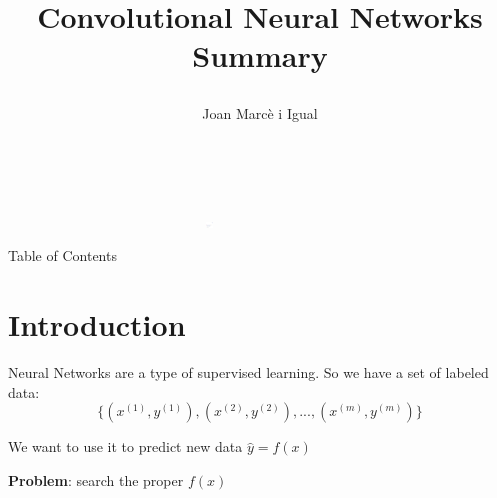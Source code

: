 \documentclass[xcolor=x11names,compress]{beamer}
\begin{document}
{ 
    \begin{frame}
    
    \vspace{-1.5cm}
    \hfill{}
    \begin{flushleft}
        \hspace{-1cm}\includegraphics[width=0.8\textwidth, height=0.4em]{title_line.pdf}\hfill
        
        \title{
            \begin{flushleft}{\huge \color{BHKpresentationDark} Convolutional Neural Networks Summary} 
        \end{flushleft}}
        
        \date{$~~$}
        \author[Joan]{\begin{flushleft}\vspace{-1cm} Joan Marcè i Igual\end{flushleft}}
        \titlepage
    \end{flushleft}
\end{frame}
}

\begin{frame}{Table of Contents}
	\tableofcontents
\end{frame}

\section{Introduction}
\begin{frame}{\secname}
	Neural Networks are a type of supervised learning. So we have a set of labeled data:
	$$\{(x^{(1)}, y^{(1)}), (x^{(2)}, y^{(2)}), ..., (x^{(m)}, y^{(m)})\}$$
	
	We want to use it to predict new data $\hat{y} = f(x)$
	
	\textbf{Problem}: search the proper $f(x)$
\end{frame}
\end{document}
